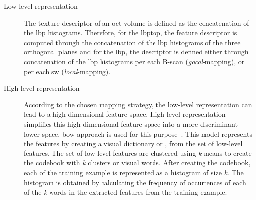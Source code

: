 \begin{description}

\item[Low-level representation] The texture descriptor of an \ac{oct} volume is defined as the concatenation of the \ac{lbp} histograms.
Therefore, for the \ac{lbptop}, the feature descriptor is computed through the concatenation of the \ac{lbp} histograms of the three orthogonal planes and for the \ac{lbp}, the descriptor is defined either through concatenation of the \ac{lbp} histograms per each B-scan (\emph{gocal}-mapping), or per each \ac{sw} (\emph{local}-mapping).\\

\item[High-level representation] According to the chosen mapping strategy, the low-level representation can lead to a high dimensional feature space.
High-level representation simplifies this high dimensional feature space into a more discriminant lower space.
\ac{bow} approach is used for this purpose~\cite{Sivic2003}.
This model represents the features by creating a visual dictionary or , from the set of low-level features.
The set of low-level features are clustered using \textit{k}-means to create the codebook with \textit{k} clusters or visual words.
After creating the codebook, each of the training example is represented as a histogram of size \textit{k}.
The histogram is obtained by calculating the frequency of occurrences of each of the \textit{k} words in the extracted features from the training example.

\end{description}


